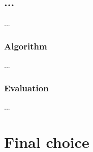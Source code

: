 \subsection{...}

...

\subsubsection{Algorithm}

...

\subsubsection{Evaluation}

...



\section{Final choice}
